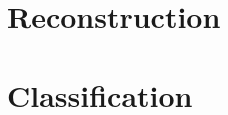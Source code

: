 \documentclass[../../thesis.tex]{subfiles}
\begin{document}
\section{Reconstruction}

\section{Classification}
\end{document}
